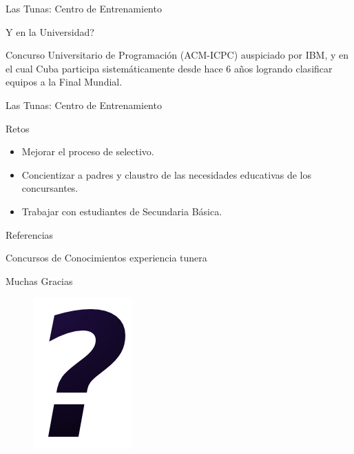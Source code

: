 \documentclass{beamer}
\begin{document}
\begin{frame}{\LARGE Las Tunas: Centro de Entrenamiento}
\LARGE
\begin{block}{Y en la Universidad?} 
	
	\pause
	
	Concurso Universitario de Programaci\'on (ACM-ICPC) auspiciado por
	IBM, y en el cual Cuba participa sistem\'aticamente desde hace 6 a\~nos logrando clasificar
	equipos a la Final Mundial.
	
	\end{block}
    \begin{figure}[h]
	\end{figure}

\end{frame}

\begin{frame}{\LARGE Las Tunas: Centro de Entrenamiento}
  \LARGE
  \begin{block}{Retos} 
   \pause
	\begin{itemize}
	  \item Mejorar el proceso de selectivo.
	  \pause
      \item Concientizar a padres y claustro de las necesidades educativas de los concursantes.
      \pause      	
	  \item Trabajar con estudiantes de Secundaria B\'asica.
	\end{itemize}
  \end{block}
  
\end{frame}

\begin{frame}{\LARGE Referencias}
\small
   \nocite{*}
   
   
\end{frame}



\begin{frame}{\LARGE Concursos de Conocimientos experiencia tunera}
\begin{center}
	\Huge
	Muchas Gracias
	
	\begin{figure}[h]
		\includegraphics[scale=.5]{q.png}
	\end{figure}
 \end{center} 
\end{frame}
\end{document}
